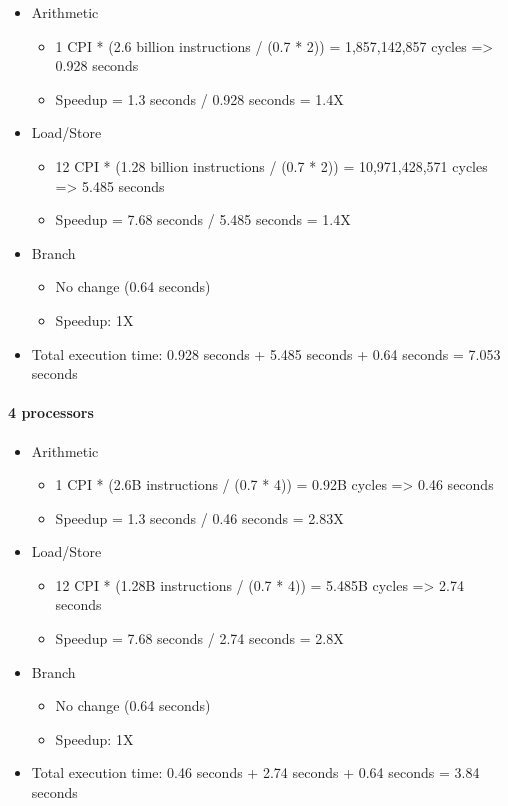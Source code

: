 \documentclass[]{article}
\let\oldparagraph\paragraph
\renewcommand{\paragraph}[1]{\oldparagraph{#1}\mbox{}}
\begin{document}
\begin{itemize}
\item
  Arithmetic

  \begin{itemize}
  \item
    1 CPI * (2.6 billion instructions / (0.7 * 2)) = 1,857,142,857
    cycles =\textgreater{} 0.928 seconds
  \item
    Speedup = 1.3 seconds / 0.928 seconds = 1.4X
  \end{itemize}
\item
  Load/Store

  \begin{itemize}
  \item
    12 CPI * (1.28 billion instructions / (0.7 * 2)) = 10,971,428,571
    cycles =\textgreater{} 5.485 seconds
  \item
    Speedup = 7.68 seconds / 5.485 seconds = 1.4X
  \end{itemize}
\item
  Branch

  \begin{itemize}
  \item
    No change (0.64 seconds)
  \item
    Speedup: 1X
  \end{itemize}
\item
  Total execution time: 0.928 seconds + 5.485 seconds + 0.64 seconds =
  7.053 seconds
\end{itemize}

\paragraph{4 processors}\label{header-n4963}

\begin{itemize}
\item
  Arithmetic

  \begin{itemize}
  \item
    1 CPI * (2.6B instructions / (0.7 * 4)) = 0.92B cycles
    =\textgreater{} 0.46 seconds
  \item
    Speedup = 1.3 seconds / 0.46 seconds = 2.83X
  \end{itemize}
\item
  Load/Store

  \begin{itemize}
  \item
    12 CPI * (1.28B instructions / (0.7 * 4)) = 5.485B cycles
    =\textgreater{} 2.74 seconds
  \item
    Speedup = 7.68 seconds / 2.74 seconds = 2.8X
  \end{itemize}
\item
  Branch

  \begin{itemize}
  \item
    No change (0.64 seconds)
  \item
    Speedup: 1X
  \end{itemize}
\item
  Total execution time: 0.46 seconds + 2.74 seconds + 0.64 seconds =
  3.84 seconds
\end{itemize}
\end{document}
